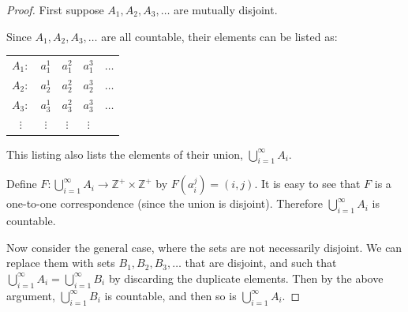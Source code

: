 \documentclass[14pt]{extarticle}
\newcommand{\Z}{\mathbb{Z}}
\begin{document}
\begin{proof}
First suppose \(A_1, A_2, A_3, \ldots\) are mutually disjoint.

Since \(A_1, A_2, A_3, \ldots\) are all countable, their elements can be listed as:

\begin{center}
\begin{tabular}{ccccc}
\(A_1:\) & \(a_1^1\) & \(a_1^2\) & \(a_1^3\) & \(\ldots\)\\
\(A_2:\) & \(a_2^1\) & \(a_2^2\) & \(a_2^3\) & \(\ldots\)\\
\(A_3:\) & \(a_3^1\) & \(a_3^2\) & \(a_3^3\) & \(\ldots\)\\
\(\vdots\) & \(\vdots\) & \(\vdots\) & \(\vdots\) & \\
\end{tabular}
\end{center}

This listing also lists the elements of their union, \(\bigcup_{i=1}^{\infty} A_i\).

Define \(F: \bigcup_{i=1}^{\infty} A_i \to \Z^+ \times \Z^+\) by \(F(a_i^j) = (i, j)\). It is easy to see that $F$ is 
a one-to-one correspondence (since the union is disjoint). Therefore \(\bigcup_{i=1}^{\infty} A_i\) is countable.

Now consider the general case, where the sets are not necessarily disjoint. We can replace them with sets \(B_1,
B_2, B_3, \ldots\) that are disjoint, and such that \(\bigcup_{i=1}^{\infty} A_i = \bigcup_{i=1}^{\infty} B_i\)
by discarding the duplicate elements. Then by the above argument, \(\bigcup_{i=1}^{\infty} B_i\) is countable, and
then so is \(\bigcup_{i=1}^{\infty} A_i\).
\end{proof}
\end{document}
